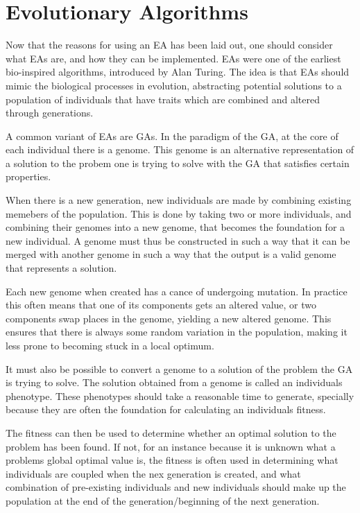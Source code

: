 

\section{Evolutionary Algorithms} %
\label{sec:evolutionary_algorithms}
Now that the reasons for using an EA has been laid out, one should consider what EAs are, and how they can be implemented. EAs were one of the earliest bio-inspired algorithms, introduced by Alan Turing. The idea is that EAs should mimic the biological processes in evolution, abstracting potential solutions to a population of individuals that have traits which are combined and altered through generations.

A common variant of EAs are GAs. In the paradigm of the GA, at the core of each individual there is a genome. This genome is an alternative representation of a solution to the probem one is trying to solve with the GA that satisfies certain properties.

When there is a new generation, new individuals are made by combining existing memebers of the population. This is done by taking two or more individuals, and combining their genomes into a new genome, that becomes the foundation for a new individual. A genome must thus be constructed in such a way that it can be merged with another genome in such a way that the output is a valid genome that represents a solution.

Each new genome when created has a cance of undergoing mutation. In practice this often means that one of its components gets an altered value, or two components swap places in the genome, yielding a new altered genome. This ensures that there is always some random variation in the population, making it less prone to becoming stuck in a local optimum.

It must also be possible to convert a genome to a solution of the problem the GA is trying to solve. The solution obtained from a genome is called an individuals phenotype. These phenotypes should take a reasonable time to generate, specially because they are often the foundation for calculating an individuals fitness.

The fitness can then be used to determine whether an optimal solution to the problem has been found. If not, for an instance because it is unknown what a problems global optimal value is, the fitness is often used in determining what individuals are coupled when the nex generation is created, and what combination of pre-existing individuals and new individuals should make up the population at the end of the generation/beginning of the next generation.

